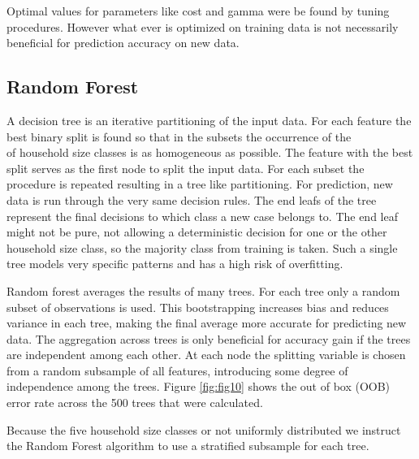 \documentclass[]{article}
\newenvironment{Shaded}{\begin{snugshade}}{\end{snugshade}}
\newcommand{\DataTypeTok}[1]{\textcolor[rgb]{0.13,0.29,0.53}{#1}}
\newcommand{\DecValTok}[1]{\textcolor[rgb]{0.00,0.00,0.81}{#1}}
\newcommand{\FloatTok}[1]{\textcolor[rgb]{0.00,0.00,0.81}{#1}}
\newcommand{\KeywordTok}[1]{\textcolor[rgb]{0.13,0.29,0.53}{\textbf{#1}}}
\newcommand{\NormalTok}[1]{#1}
\newcommand{\OperatorTok}[1]{\textcolor[rgb]{0.81,0.36,0.00}{\textbf{#1}}}
\newcommand{\OtherTok}[1]{\textcolor[rgb]{0.56,0.35,0.01}{#1}}
\newcommand{\StringTok}[1]{\textcolor[rgb]{0.31,0.60,0.02}{#1}}
\begin{document}
Optimal values for parameters like cost and gamma were be found by
tuning procedures. However what ever is optimized on training data is
not necessarily beneficial for prediction accuracy on new data.

\hypertarget{random-forest}{%
\subsection{Random Forest}\label{random-forest}}

A decision tree is an iterative partitioning of the input data. For each
feature the best binary split is found so that in the subsets the
occurrence of the\\
of household size classes is as homogeneous as possible. The feature
with the best split serves as the first node to split the input data.
For each subset the procedure is repeated resulting in a tree like
partitioning. For prediction, new data is run through the very same
decision rules. The end leafs of the tree represent the final decisions
to which class a new case belongs to. The end leaf might not be pure,
not allowing a deterministic decision for one or the other household
size class, so the majority class from training is taken. Such a single
tree models very specific patterns and has a high risk of overfitting.

Random forest averages the results of many trees. For each tree only a
random subset of observations is used. This bootstrapping increases bias
and reduces variance in each tree, making the final average more
accurate for predicting new data. The aggregation across trees is only
beneficial for accuracy gain if the trees are independent among each
other. At each node the splitting variable is chosen from a random
subsample of all features, introducing some degree of independence among
the trees. Figure \ref{fig:fig10} shows the out of box (OOB) error rate
across the 500 trees that were calculated.

Because the five household size classes or not uniformly distributed we
instruct the Random Forest algorithm to use a stratified subsample for
each tree.

\begin{Shaded}
\end{Shaded}
\end{document}
